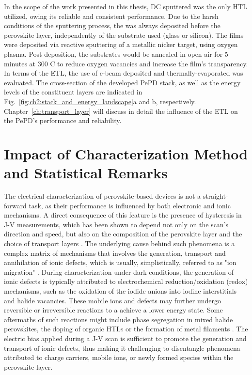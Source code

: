 In the scope of the work presented in this thesis, DC sputtered  was the only HTL utilized, owing its reliable and consistent performance. Due to the harsh conditions of the sputtering process, the  was always deposited before the perovskite layer, independently of the substrate used (glass or silicon). The films were deposited via reactive sputtering of a metallic nicker target, using oxygen plasma. Post-deposition, the substrates would be annealed in open air for 5 minutes at 300 \degree
C to reduce oxygen vacancies and increase the film's transparency. In terms of the ETL, the use of e-beam deposited  and thermally-evaporated  was evaluated. The cross-section of the developed PePD stack, as well as the energy levels of the constituent layers are indicated in Fig.~\ref{fig:ch2:stack_and_energy_landscape}a and b, respectively. Chapter~\ref{ch:transport_layer} will discuss in detail the influence of the ETL on the PePD's performance and reliability. 


\section{Impact of Characterization Method and Statistical Remarks}



The electrical characterization of perovskite-based devices is not a straight-forward task, as their performance is influenced by both electronic and ionic mechanisms. A direct consequence of this feature is the presence of hysteresis in J-V measurements, which has been shown to depend not only on the scan's direction and speed, but also on the composition of the perovskite layer and the choice of transport layers \cite{Snaith2014AnomalousCells,Dualeh2014ImpedanceCells}.
The underlying cause behind such phenomena is a complex matrix of mechanisms that involves the generation, transport and annihilation of ionic defects, which is usually, simplistically, referred to as "ion migration" \cite{Xu2024BeyondPerspective}. During characterization under dark conditions, the generation of ionic defects is typically attributed to electrochemical reduction/oxidation (redox) mechanisms, such as the oxidation of the iodide anions into iodine interstitials and halide vacancies. These mobile ions and defects may further undergo reversible or irreversible reactions to a achieve a lower energy state. Some aftermaths of such  reactions might include phase segregation in mixed halide perovskites, the doping of organic HTLs or the formation of metal filaments \cite{Kerner2021OrganicDevices, Hoke2014ReversiblePhotovoltaics,Xu2023Reverse-biasCells}. The electric bias applied during a J-V scan is sufficient to promote the generation and transport of ionic defects, thus making it challenging to disentangle phenomena attributed to charge carriers, mobile ions, or newly formed species within the perovskite layer. 

